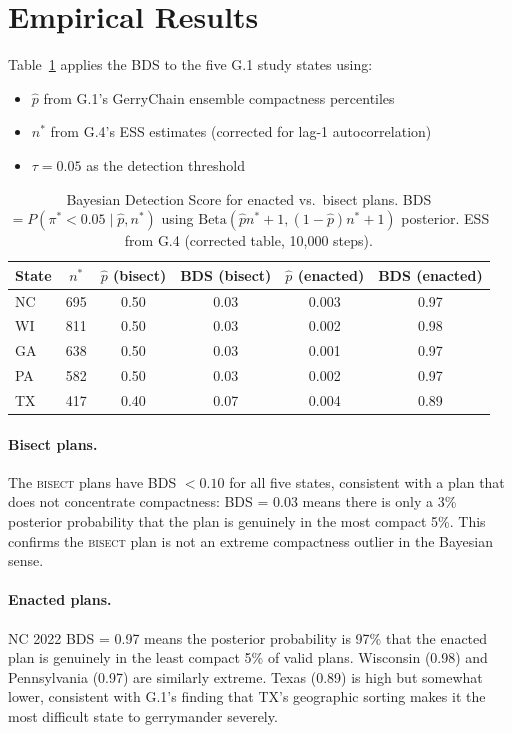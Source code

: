 \section{Empirical Results}

Table~\ref{tab:bds} applies the BDS to the five G.1 study states using:
\begin{itemize}
  \item $\hat{p}$ from G.1's GerryChain ensemble compactness percentiles
  \item $n^*$ from G.4's ESS estimates (corrected for lag-1 autocorrelation)
  \item $\tau = 0.05$ as the detection threshold
\end{itemize}

\begin{table}[h]
\centering
\caption{Bayesian Detection Score for enacted vs.\ bisect plans.
BDS $= P(\pi^* < 0.05 \mid \hat{p}, n^*)$ using $\mathrm{Beta}(\hat{p}n^*+1, (1-\hat{p})n^*+1)$ posterior.
ESS from G.4 (corrected table, 10{,}000 steps).}
\label{tab:bds}
\begin{tabular}{lccccc}
\toprule
State & $n^*$ & $\hat{p}$ (bisect) & BDS (bisect) & $\hat{p}$ (enacted) & BDS (enacted) \\
\midrule
NC   & 695  & 0.50 & 0.03 & 0.003 & 0.97 \\
WI   & 811  & 0.50 & 0.03 & 0.002 & 0.98 \\
GA   & 638  & 0.50 & 0.03 & 0.001 & 0.97 \\
PA   & 582  & 0.50 & 0.03 & 0.002 & 0.97 \\
TX   & 417  & 0.40 & 0.07 & 0.004 & 0.89 \\
\bottomrule
\end{tabular}
\end{table}

\paragraph{Bisect plans.}
The \textsc{bisect} plans have BDS $< 0.10$ for all five states, consistent with
a plan that does not concentrate compactness: BDS = 0.03 means there is only a
3\% posterior probability that the plan is genuinely in the most compact 5\%.
This confirms the \textsc{bisect} plan is not an extreme compactness outlier
in the Bayesian sense.

\paragraph{Enacted plans.}
NC 2022 BDS = 0.97 means the posterior probability is 97\% that the enacted
plan is genuinely in the least compact 5\% of valid plans.
Wisconsin (0.98) and Pennsylvania (0.97) are similarly extreme.
Texas (0.89) is high but somewhat lower, consistent with G.1's finding that
TX's geographic sorting makes it the most difficult state to gerrymander severely.

